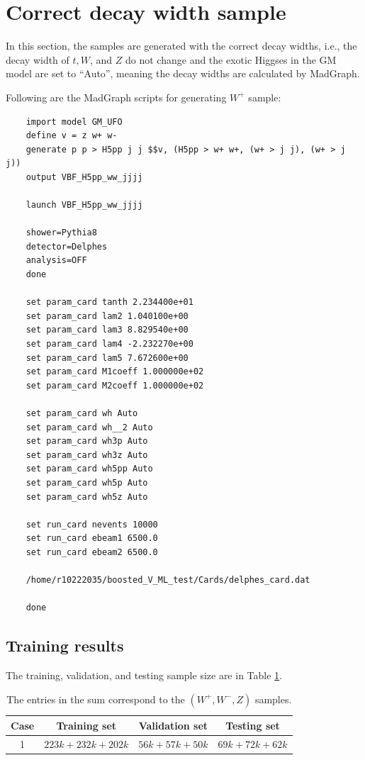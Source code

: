 \documentclass[12pt]{article}
\begin{document}
\section{Correct decay width sample}%
\label{sec:correct_decay_width_sample}
	In this section, the samples are generated with the correct decay widths, i.e., the decay width of $t, W$, and $Z$ do not change and the exotic Higgses in the GM model are set to “Auto”, meaning the decay widths are calculated by MadGraph.

	Following are the MadGraph scripts for generating $W^{+}$ sample:
	\begin{verbatim}
	import model GM_UFO
	define v = z w+ w-
	generate p p > H5pp j j $$v, (H5pp > w+ w+, (w+ > j j), (w+ > j j))
	output VBF_H5pp_ww_jjjj

	launch VBF_H5pp_ww_jjjj

	shower=Pythia8
	detector=Delphes
	analysis=OFF
	done

	set param_card tanth 2.234400e+01
	set param_card lam2 1.040100e+00
	set param_card lam3 8.829540e+00
	set param_card lam4 -2.232270e+00
	set param_card lam5 7.672600e+00
	set param_card M1coeff 1.000000e+02
	set param_card M2coeff 1.000000e+02

	set param_card wh Auto
	set param_card wh__2 Auto
	set param_card wh3p Auto
	set param_card wh3z Auto
	set param_card wh5pp Auto
	set param_card wh5p Auto
	set param_card wh5z Auto

	set run_card nevents 10000
	set run_card ebeam1 6500.0
	set run_card ebeam2 6500.0

	/home/r10222035/boosted_V_ML_test/Cards/delphes_card.dat

	done
	\end{verbatim}
	\subsection{Training results}%
	\label{sub:training_results_correct_decay_width}
		The training, validation, and testing sample size are in Table \ref{tab:sample_size_correct_decay_width}.
		\begin{table}[htpb]
			\centering
			\caption{The entries in the sum correspond to the $(W^{+}, W^{-}, Z)$ samples.}
			\label{tab:sample_size_correct_decay_width}
			\begin{tabular}{c|c|c|c}
			Case & Training set     & Validation set & Testing set   \\ \hline
			1    & $223k+232k+202k$ & $56k+57k+50k$ & $69k+72k+62k$\\
			\end{tabular}
		\end{table}
\end{document}

